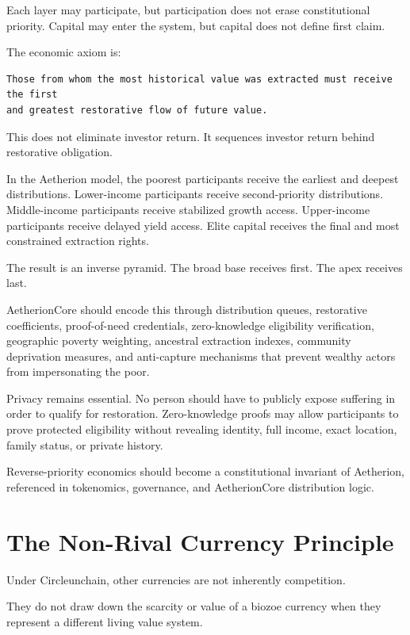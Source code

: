 ﻿\documentclass[12pt]{article}
\begin{document}
Each layer may participate, but participation does not erase constitutional priority. Capital may enter the system, but capital does not define first claim.

The economic axiom is:

\begin{verbatim}
Those from whom the most historical value was extracted must receive the first
and greatest restorative flow of future value.
\end{verbatim}

This does not eliminate investor return. It sequences investor return behind restorative obligation.

In the Aetherion model, the poorest participants receive the earliest and deepest distributions. Lower-income participants receive second-priority distributions. Middle-income participants receive stabilized growth access. Upper-income participants receive delayed yield access. Elite capital receives the final and most constrained extraction rights.

The result is an inverse pyramid. The broad base receives first. The apex receives last.

AetherionCore should encode this through distribution queues, restorative coefficients, proof-of-need credentials, zero-knowledge eligibility verification, geographic poverty weighting, ancestral extraction indexes, community deprivation measures, and anti-capture mechanisms that prevent wealthy actors from impersonating the poor.

Privacy remains essential. No person should have to publicly expose suffering in order to qualify for restoration. Zero-knowledge proofs may allow participants to prove protected eligibility without revealing identity, full income, exact location, family status, or private history.

Reverse-priority economics should become a constitutional invariant of Aetherion, referenced in tokenomics, governance, and AetherionCore distribution logic.

\section{The Non-Rival Currency Principle}


Under Circleunchain, other currencies are not inherently competition.

They do not draw down the scarcity or value of a biozoe currency when they represent a different living value system.
\end{document}
